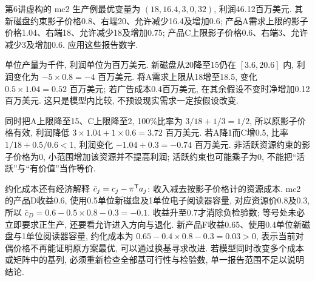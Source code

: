 \begin{example}
第6讲虚构的 mc2 生产例最优变量为 $(18,16.4,3,0,32)$, 利润46.12百万美元. 其新磁盘约束影子价格0.8、右端20、允许减少16.4及增加0.6; 产品A需求上限的影子价格1.04、右端18、允许减少18及增加0.75; 产品C上限影子价格0.6、右端3、允许减少3及增加0.6. 应用这些报告数字.
\end{example}
\begin{solution}
单位产量为千件, 利润单位为百万美元. 新磁盘从20降至15仍在 $[3.6,20.6]$ 内, 利润变化为 $-5\times0.8=-4$ 百万美元. 将A需求上限从18增至18.5, 变化 $0.5\times1.04=0.52$ 百万美元; 若广告成本0.4百万美元, 在其余假设不变时净增加0.12百万美元. 这只是模型内比较, 不预设现实需求一定按假设改变.

同时把A上限降至15、C上限降至2, 100\%比率为 $3/18+1/3=1/2$, 所以原影子价格有效, 利润降低 $3\times1.04+1\times0.6=3.72$ 百万美元. 若A降1而C增0.5, 比率 $1/18+0.5/0.6<1$, 利润变化 $-1.04+0.3=-0.74$ 百万美元. 非活跃资源约束的影子价格为0, 小范围增加该资源并不提高利润; 活跃约束也可能乘子为0, 不能把“活跃”与“有价值”当作等价.
\end{solution}

约化成本还有经济解释 $\bar c_j=c_j-\pi^{\mathsf T} a_j$: 收入减去按影子价格计的资源成本. mc2 的产品D收益0.6, 使用0.5单位新磁盘及1单位电子阅读器容量, 对应资源价0.8及0.3, 所以 $\bar c_D=0.6-0.5\times0.8-0.3=-0.1$. 收益升至0.7才消除负检验数; 等号处未必立即要求正生产, 还要看允许进入方向与退化. 新产品F收益0.65、使用0.4单位新磁盘与1单位阅读器容量, 约化成本为 $0.65-0.4\times0.8-0.3=0.03>0$, 表示当前对偶价格不再能证明原方案最优, 可以通过换基寻求改进. 若模型同时改变多个成本或矩阵中的基列, 必须重新检查全部基可行性与检验数, 单一报告范围不足以说明结论.
